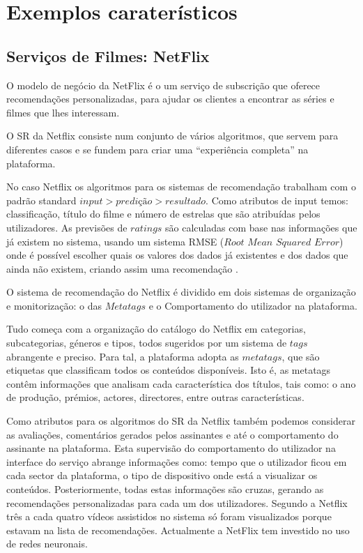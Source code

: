 \section{Exemplos caraterísticos}
\subsection{ Serviços de Filmes: NetFlix}
\par O modelo de negócio da NetFlix é o um serviço de subscrição que oferece recomendações personalizadas, para ajudar os clientes a encontrar as séries e filmes que lhes interessam.
\par O SR da Netflix consiste num conjunto de vários algoritmos, que servem para diferentes casos e se fundem para criar uma “experiência completa” na plataforma.
\par No caso Netflix os algoritmos para os sistemas de recomendação trabalham com o padrão standard $input> predição> resultado$. Como atributos de input temos: classificação, título do filme e número de estrelas que são atribuídas pelos utilizadores. As previsões de $ratings$ são calculadas com base nas informações que já existem no sistema, usando um sistema RMSE ($Root$ $Mean$ $Squared$ $Error$) onde é possível escolher quais os valores dos dados já existentes e dos dados que ainda não existem, criando assim uma recomendação \cite{ref_url1}.
\par O sistema de recomendação do Netflix é dividido em dois sistemas de organização e monitorização: o das $Metatags$ e o Comportamento do utilizador na plataforma. 
\par Tudo começa com a organização do catálogo do Netflix em categorias, subcategorias, géneros e tipos, todos sugeridos por um sistema de $tags$ abrangente e preciso. Para tal, a plataforma adopta as $metatags$, que são etiquetas que classificam todos os conteúdos disponíveis. Isto é, as metatags contêm informações que analisam cada característica dos títulos, tais como: o ano de produção, prémios, actores, directores, entre outras características. 
\par Como atributos para os algoritmos do SR da Netflix também podemos considerar as avaliações, comentários gerados pelos assinantes e até o comportamento do assinante na plataforma. Esta supervisão do comportamento do utilizador na interface do serviço abrange informações como: tempo que o utilizador ficou em cada sector da plataforma, o tipo de dispositivo onde está a visualizar os conteúdos. Posteriormente, todas estas informações são cruzas, gerando as recomendações personalizadas para cada um dos utilizadores. Segundo a Netflix três a cada quatro vídeos assistidos no sistema só foram visualizados porque estavam na lista de recomendações. Actualmente a NetFlix tem investido no uso de redes neuronais.





